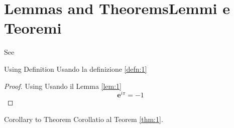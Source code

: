 \section[L and T]{\ifCDLeng Lemmas and Theorems\fi\ifCDLita Lemmi e Teoremi\fi}

\begin{Lem}[Cauchy]\label{lem:1}
  \lipsum[3]

  See \cite{wiki:it:tautol}
\end{Lem}

\begin{Theorem}\label{thm:1}
  \CDLeng Using Definition
  \CDLita Usando la definizione
  \ref{defn:1} \\
  \lipsum[4]
  \begin{proof}
    \CDLeng Using 
    \CDLita Usando il Lemma \ref{lem:1}
    \begin{equation}
      \label{eq:1}
      {\mathbf{e}}^{i \pi }=-1
    \end{equation}
  \end{proof}
\end{Theorem}


\begin{Cor}\label{cor:1}
  \CDLeng Corollary to Theorem
  \CDLita Corollatio al Teorem
  \ref{thm:1}.
  \\
  \lipsum[6]
\end{Cor}

